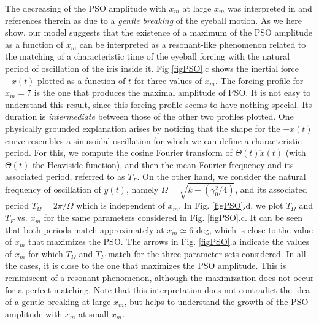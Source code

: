 \documentclass[prl]{revtex4}
\begin{document}
The decreasing of the PSO amplitude with $x_m$ at large $x_m$ was interpreted in \cite{holm} and references therein as due to a {\em gentle breaking} of the eyeball motion. As we here show, our model suggests that the existence of a maximum of the PSO amplitude as a function of $x_m$ can be interpreted as a resonant-like phenomenon related to the matching of a characteristic time of the eyeball forcing with the natural period of oscillation of the iris inside it. Fig \ref{figPSO}.c shows the inertial force $-\ddot{x}(t)$ plotted as a function of $t$ for three values of $x_m$. The forcing profile for $x_m=7$ is the one that produces the maximal amplitude of PSO. It is not easy to understand this result, since this forcing profile seems to have nothing special. Its duration is {\em intermediate} between those of the other two profiles plotted. One physically grounded explanation arises by noticing that the shape for the $-\ddot{x}(t)$ curve resembles a sinusoidal oscillation for which we can define a characteristic period. For this, we compute the cosine Fourier transform of $\Theta(t)\ddot{x}(t)$ (with $\Theta(t)$ the Heaviside function), and then the mean Fourier frequency and its associated period, referred to as $T_F$. On the other hand, we consider the natural frequency of oscillation of $y(t)$, namely $\Omega=\sqrt{k-(\gamma_0^2/4)}$, and its associated period $T_\Omega=2 \pi/\Omega$ which is independent of $x_m$. In Fig. \ref{figPSO}.d. we plot $T_\Omega$ and $T_F$ vs. $x_m$ for the same parameters considered in Fig. \ref{figPSO}.c. It can be seen that both periods match approximately at $x_m\simeq6$ deg, which is close to the value of $x_m$ that maximizes the PSO. The arrows in Fig. \ref{figPSO}.a indicate the values of $x_m$ for which $T_\Omega$ and $T_F$ match for the three parameter sets considered. In all the cases, it is close to the one that maximizes the PSO amplitude. This is reminiscent of a resonant phenomenon, although the maximization does not occur for a perfect matching. Note that this interpretation does not contradict the idea of a gentle breaking at large $x_m$, but helps to understand the growth of the PSO amplitude with $x_m$ at small $x_m$. 
\end{document}
